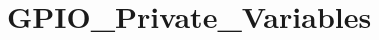 \hypertarget{group___g_p_i_o___private___variables}{}\section{G\+P\+I\+O\+\_\+\+Private\+\_\+\+Variables}
\label{group___g_p_i_o___private___variables}
